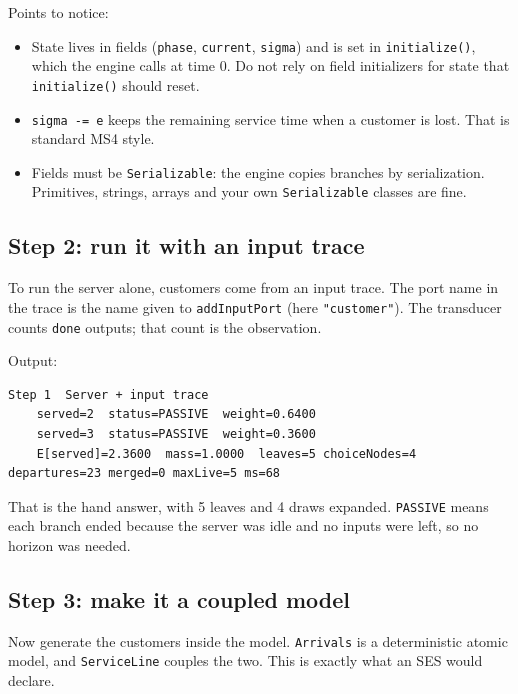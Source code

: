 \documentclass[11pt]{article}
\newcommand{\code}[1]{\texttt{#1}}
\newcommand{\src}{../../src}
\begin{document}


Points to notice:
\begin{itemize}
\item State lives in fields (\code{phase}, \code{current}, \code{sigma}) and is set in \code{initialize()}, which the
  engine calls at time 0. Do not rely on field initializers for state that \code{initialize()} should reset.
\item \code{sigma -= e} keeps the remaining service time when a customer is lost. That is standard MS4 style.
\item Fields must be \code{Serializable}: the engine copies branches by serialization. Primitives, strings, arrays and
  your own \code{Serializable} classes are fine.
\end{itemize}

\subsection{Step 2: run it with an input trace}
To run the server alone, customers come from an input trace. The port name in the trace is the name given to
\code{addInputPort} (here \code{"customer"}). The transducer counts \code{done} outputs; that count is the observation.



Output:
\begin{lstlisting}[style=plain]
Step 1  Server + input trace
    served=2  status=PASSIVE  weight=0.6400
    served=3  status=PASSIVE  weight=0.3600
    E[served]=2.3600  mass=1.0000  leaves=5 choiceNodes=4 departures=23 merged=0 maxLive=5 ms=68
\end{lstlisting}
That is the hand answer, with 5 leaves and 4 draws expanded. \code{PASSIVE} means each branch ended because the server
was idle and no inputs were left, so no horizon was needed.

\subsection{Step 3: make it a coupled model}
Now generate the customers inside the model. \code{Arrivals} is a deterministic atomic model, and \code{ServiceLine}
couples the two. This is exactly what an SES would declare.
\end{document}
